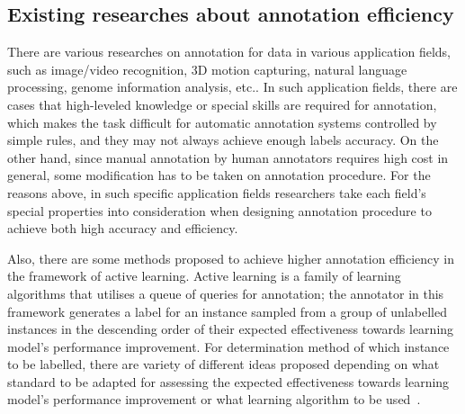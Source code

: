 \documentclass[a4paper,conference]{IEEEtran}
\begin{document}
\subsection{Existing researches about annotation efficiency}\label{subsec:cost_reduction}
There are various researches on annotation for data in various application fields, such as image/video recognition, 3D motion capturing, natural language processing, genome information analysis, etc.\cite{Zhang:2012,Russakovsky:2015,Muller:2009,Bird:2013,Richardson:2012}.
In such application fields, there are cases that high-leveled knowledge or special skills are required for annotation, which makes the task difficult for automatic annotation systems controlled by simple rules, and they may not always achieve enough labels accuracy.
On the other hand, since manual annotation by human annotators requires high cost in general, some modification has to be taken on annotation procedure.
For the reasons above, in such specific application fields researchers take each field's special properties into consideration when designing annotation procedure to achieve both high accuracy and efficiency.

Also, there are some methods proposed to achieve higher annotation efficiency in the framework of active learning.
Active learning is a family of learning algorithms that utilises a queue of queries for annotation; the annotator in this framework generates a label for an instance sampled from a group of unlabelled instances in the descending order of their expected effectiveness towards learning model's performance improvement.
For determination method of which instance to be labelled, there are variety of different ideas proposed depending on what standard to be adapted for assessing the expected effectiveness towards learning model's performance improvement or what learning algorithm to be used~\cite{Settles:2009,Wang:2011}.
\end{document}
